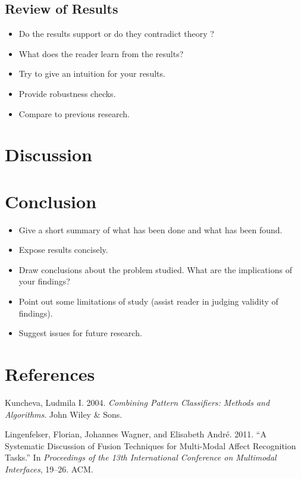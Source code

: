 \documentclass[a4paper,11pt]{article}
\newenvironment{CSLReferences}%
  {}%
  {\par}
\begin{document}
\hypertarget{review-of-results}{%
\subsection{Review of Results}\label{review-of-results}}
\begin{itemize}
\item
  Do the results support or do they contradict theory ?
\item
  What does the reader learn from the results?
\item
  Try to give an intuition for your results.
\item
  Provide robustness checks.
\item
  Compare to previous research.
\end{itemize}
\hypertarget{discussion}{%
\section{Discussion}\label{discussion}}

\hypertarget{conclusion}{%
\section{Conclusion}\label{conclusion}}
\begin{itemize}
\item
  Give a short summary of what has been done and what has been found.
\item
  Expose results concisely.
\item
  Draw conclusions about the problem studied. What are the implications of your
  findings?
\item
  Point out some limitations of study (assist reader in judging validity of
  findings).
\item
  Suggest issues for future research.
\end{itemize}
\newpage

\hypertarget{references}{%
\section*{References}\label{references}}

\noindent

\setlength{\parindent}{-0.5cm}
\setlength{\leftskip}{0.5cm}
\setlength{\parskip}{8pt}

\hypertarget{refs}{}
\begin{CSLReferences}{1}{0}
\leavevmode\hypertarget{ref-kuncheva2004combining}{}%
Kuncheva, Ludmila I. 2004. \emph{Combining Pattern Classifiers: Methods and Algorithms}. John Wiley \& Sons.

\leavevmode\hypertarget{ref-lingenfelser2011systematic}{}%
Lingenfelser, Florian, Johannes Wagner, and Elisabeth André. 2011. {``A Systematic Discussion of Fusion Techniques for Multi-Modal Affect Recognition Tasks.''} In \emph{Proceedings of the 13th International Conference on Multimodal Interfaces}, 19--26. ACM.

\end{CSLReferences}
\indent
\setlength{\parindent}{17pt}
\setlength{\leftskip}{0pt}
\setlength{\parskip}{0pt}
\end{document}
